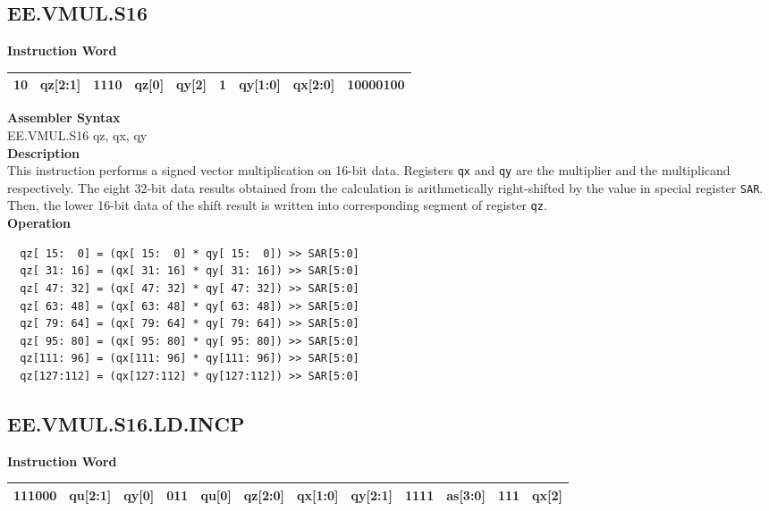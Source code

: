 \clearpage
\subsection{EE.VMUL.S16}\label{instruction:EEVMULS16}
\setlength\tabcolsep{6pt}
\textbf{Instruction Word} \\
\begin{tabular}{|c|c|c|c|c|c|c|c|c|}
	\hline
	10 & qz[2:1] & 1110 & qz[0] & qy[2] & 1 & qy[1:0] & qx[2:0] & 10000100 \\
	\hline
\end{tabular}

\textbf{Assembler Syntax} \\
EE.VMUL.S16 qz, qx, qy \\
\textbf{Description} \\
This instruction performs a signed vector multiplication on 16-bit data. Registers \lstinline{qx} and \lstinline{qy} are the multiplier and the multiplicand respectively. The eight 32-bit data results obtained from the calculation is arithmetically right-shifted by the value in special register \lstinline{SAR}. Then, the lower 16-bit data of the shift result is written into corresponding segment of register \lstinline{qz}.\\
\textbf{Operation}
\begin{lstlisting}
  qz[ 15:  0] = (qx[ 15:  0] * qy[ 15:  0]) >> SAR[5:0]
  qz[ 31: 16] = (qx[ 31: 16] * qy[ 31: 16]) >> SAR[5:0]
  qz[ 47: 32] = (qx[ 47: 32] * qy[ 47: 32]) >> SAR[5:0]
  qz[ 63: 48] = (qx[ 63: 48] * qy[ 63: 48]) >> SAR[5:0]
  qz[ 79: 64] = (qx[ 79: 64] * qy[ 79: 64]) >> SAR[5:0]
  qz[ 95: 80] = (qx[ 95: 80] * qy[ 95: 80]) >> SAR[5:0]
  qz[111: 96] = (qx[111: 96] * qy[111: 96]) >> SAR[5:0]
  qz[127:112] = (qx[127:112] * qy[127:112]) >> SAR[5:0]
\end{lstlisting}

\clearpage
\subsection{EE.VMUL.S16.LD.INCP}\label{instruction:EEVMULS16LDINCP}
\setlength\tabcolsep{6pt}
\textbf{Instruction Word} \\
\begin{tabular}{|c|c|c|c|c|c|c|c|c|c|c|c|}
	\hline
	111000 & qu[2:1] & qy[0] & 011 & qu[0] & qz[2:0] & qx[1:0] & qy[2:1] & 1111 & as[3:0] & 111 & qx[2] \\
	\hline
\end{tabular}

